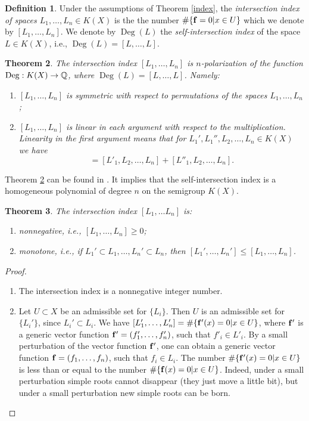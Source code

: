 \documentclass[11pt]{article}
\theoremstyle{plain}
\newtheorem{theorem}{Theorem}[section]
\theoremstyle{definition}
\newtheorem{definition}[theorem]{Definition}
\newcommand\D{\operatorname{Deg}}
\begin{document}
\begin{definition} Under the assumptions of Theorem \ref{index}, the {\it  intersection index  of  spaces $L_1,\dots,L_n\in K(X)$} is the  the number $\#\{\bold f=0|x\in U\}$ which we denote  by  $[L_1,\dots,L_n]$. We   denote by $\D(L)$ the {\it self-intersection index} of the space  $L\in K(X)$, i.e.,  $\D(L)=[L,\dots,L]$.
\end{definition}

\begin{theorem}\label{Dpolar}  The intersection index $[L_1,\dots,L_n]$ is $n$-polarization of the function $\D:K(X)\to \Bbb Q$, where $\D(L)=[L,\dots,L]$. Namely:
\begin{enumerate}

\item  $[L_1,\dots, L_n]$ is symmetric  with respect to permutations of the spaces
$L_1,\dots,L_n$;

\item $[L_1,\dots, L_n]$  is linear in each argument with respect to the multiplication.
Linearity in the first argument means that for  $L_1', L_1'', L_2,\dots,L_n\in K(X)$ we have
\begin{equation*}[L'_1 L''_1, L_2,\dots, L_n]=
[L'_1,L_2,\dots,L_n]+ [L''_1,L_2, \dots,L_n].\end{equation*}
\end{enumerate}
\end{theorem}

Theorem \ref{Dpolar} can be found in \cite{K-K10}. It implies that the self-intersection index is a homogeneous polynomial of degree $n$ on the semigroup $K(X)$.

\begin{theorem} The intersection index  $[L_1,\dots L_n]$  is:
\begin{enumerate}
\item  nonnegative, i.e., $[L_1,\dots,L_n]\geq 0$;
\item  monotone, i.e.,
if $L_1'\subset L_1, \dots, L_n'\subset L_n$, then
$ [L_1',\dots, L_n']\leq  [L_1,\dots, L_n]$.
\end{enumerate}
\end{theorem}

\begin{proof} \begin{enumerate} \item The intersection index is a nonnegative integer number.
\item Let $U\subset X$ be an admissible set for $\{L_i\}$. Then $U$ is an admissible set for $\{L_i'\}$, since $L_i'\subset L_i$.
    We have  $[L'_1,\dots, L'_n]=\#\{ \bold f'(x)=0|x\in U\}$,  where $\bold f'$
 is a generic vector function $ \bold f' =(f'_1,\dots, f'_n)$, such that $f'_i\in L'_i$. By a small perturbation of the vector function $\bold f'$, one can obtain a generic vector function $\bold f=(f_1,\dots,f_n)$, such that  $f_i\in L_i$. The number $\#\{ \bold f'(x)=0|x\in U\}$
 is less than or equal to the number $\#\{ \bold f(x)=0|x\in U\}$. Indeed,
under a small perturbation simple roots cannot disappear (they just move a little bit), but under a small perturbation new simple roots can be born.
\end{enumerate}
\end{proof}
\end{document}
